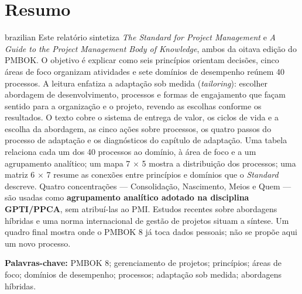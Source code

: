 \documentclass[11pt,a4paper]{article}
\newcommand{\SingleSpacing}{}
\newcommand{\onelineskip}{\baselineskip}
\newenvironment{resumo}[1][Abstract]{\section*{#1}\noindent\ignorespaces}{\bigskip}
\begin{document}
\begin{resumo}[Resumo]
\begin{otherlanguage*}{brazilian}
Este relatório sintetiza \textit{The Standard for Project Management} e \textit{A Guide to the Project Management Body of Knowledge}, ambos da oitava edição do PMBOK. O objetivo é explicar como seis princípios orientam decisões, cinco áreas de foco organizam atividades e sete domínios de desempenho reúnem 40 processos. A leitura enfatiza a adaptação sob medida (\textit{tailoring}): escolher abordagem de desenvolvimento, processos e formas de engajamento que façam sentido para a organização e o projeto, revendo as escolhas conforme os resultados. O texto cobre o sistema de entrega de valor, os ciclos de vida e a escolha da abordagem, as cinco ações sobre processos, os quatro passos do processo de adaptação e os diagnósticos do capítulo de adaptação. Uma tabela relaciona cada um dos 40 processos ao domínio, à área de foco e a um agrupamento analítico; um mapa 7 \ensuremath{\times} 5 mostra a distribuição dos processos; uma matriz 6 \ensuremath{\times} 7 resume as conexões entre princípios e domínios que o \textit{Standard} descreve. Quatro concentrações — Consolidação, Nascimento, Meios e Quem — são usadas como \textbf{agrupamento analítico adotado na disciplina GPTI/PPCA}, sem atribuí-las ao PMI. Estudos recentes sobre abordagens híbridas e uma norma internacional de gestão de projetos situam a síntese. Um quadro final mostra onde o PMBOK 8 já toca dados pessoais; não se propõe aqui um novo processo.

\vspace{\onelineskip}
\noindent\textbf{Palavras-chave:} PMBOK 8; gerenciamento de projetos; princípios; áreas de foco; domínios de desempenho; processos; adaptação sob medida; abordagens híbridas.
\end{otherlanguage*}
\end{resumo}
\clearpage

\begingroup
\SingleSpacing
\end{document}
